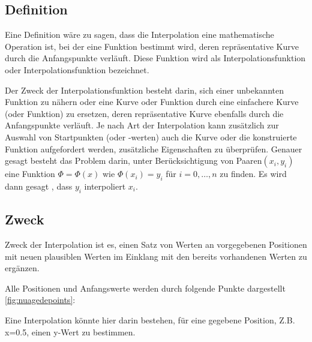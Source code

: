 {		\subsection{Definition}
		\begin{frame}
			
			\begin{definition}[Interpolation]\label{def:def1}
				\onslide<+->%
				Eine Definition wäre zu sagen, dass die Interpolation eine mathematische Operation ist, bei der eine Funktion bestimmt wird, deren repräsentative Kurve durch die Anfangspunkte verläuft. Diese Funktion wird als Interpolationsfunktion oder Interpolationsfunktion bezeichnet. 
			\end{definition}
		\end{frame}
		
		Der Zweck der Interpolationsfunktion besteht darin, sich einer unbekannten Funktion zu nähern oder eine Kurve oder Funktion durch eine einfachere Kurve (oder Funktion) zu ersetzen, deren repräsentative Kurve ebenfalls durch die Anfangspunkte verläuft.
		Je nach Art der Interpolation kann zusätzlich zur Auswahl von Startpunkten (oder -werten) auch die Kurve oder die konstruierte Funktion aufgefordert werden, zusätzliche Eigenschaften zu überprüfen.
		\noindent Genauer gesagt besteht das Problem darin, unter Berücksichtigung von Paaren\((x_i,y_i)\) eine Funktion \(\Phi = \Phi(x)\) wie \(\Phi(x_i) =y_i\) für \(i= 0,\dots,n\) zu finden. 
		Es wird dann gesagt , dass \(y_i\) interpoliert \(x_i\).
		
		
		
		\subsection{Zweck}
		\begin{frame}
			Zweck der Interpolation ist es, einen Satz von Werten an vorgegebenen Positionen mit neuen plausiblen Werten im Einklang mit den bereits vorhandenen Werten zu ergänzen.
			
			\noindent Alle Positionen und Anfangswerte werden durch folgende Punkte dargestellt \cref{fig:nuagedepoints}:
		\end{frame}
		\begin{frame}
			\begin{figure}[htb]
				\centering
				
				\mode<article>{
					\caption{nuagedepoints}
					\label{fig:nuagedepoints}
				}
			\end{figure}
			Eine Interpolation könnte hier darin bestehen, für eine gegebene Position, Z.B. x=0.5, einen y-Wert zu bestimmen.
		\end{frame}
		
}
